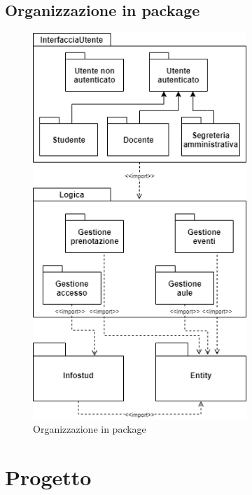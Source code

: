 \documentclass[11pt]{article}
\begin{document}
\subsection{Organizzazione in package}
\begin{figure}[H]
\centering
\includegraphics[width=0.72\textwidth]{Organizzazione in package.png}
\caption{Organizzazione in package}
\end{figure}


\section{Progetto}
\end{document}
